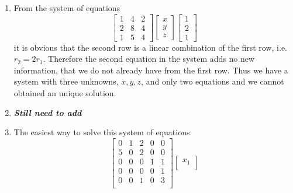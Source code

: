 \begin{enumerate}[label=(\alph*)]
    \item From the system of equations
        \begin{equation}
            \begin{bmatrix}
                1   & 4     &       2   \\
                2   & 8     &       4   \\
                1   & 5     &       4   
            \end{bmatrix}
            \begin{bmatrix}
                x   \\
                y   \\
                z
            \end{bmatrix}
            \begin{bmatrix}
                1   \\
                2   \\
                1
            \end{bmatrix}
        \end{equation}
        it is obvious that the second row is a linear
        combination of the first row, i.e. $r_{2}=2r_{1}$. Therefore the
        second equation in the system adds no new information, that we do
        not already have from the first row. Thus we have a system with
        three unknowns, $x,y,z$, and only two equations and we cannot
        obtained an unique solution.    
    \item \emph{\textbf{Still need to add}}
    \item The easiest way to solve this system of equations 
        \begin{subequations}
            \begin{equation}
                \begin{bmatrix}
                    0       &   1       &   2   &   0   &   0   \\
                    5       &   0       &   2   &   0   &   0   \\
                    0       &   0       &   0   &   1   &   1   \\
                    0       &   0       &   0   &   0   &   1   \\
                    0       &   0       &   1   &   0   &   3   \\
                \end{bmatrix}
                \begin{bmatrix}
                    x_{1}   \\

\end{bmatrix}
\end{equation}
\end{subequations}
\end{enumerate}
